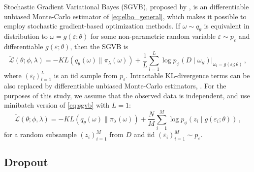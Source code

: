 \documentclass[a4paper,10pt]{article}
\begin{document}
Stochastic Gradient Variational Bayes (SGVB), proposed by \cite{kingma_auto-encoding_2014},
is an differentiable unbiased Monte-Carlo estimator of \eqref{eq:elbo_general}, which makes
it possible to employ stochastic gradient-based optimization methods. If $
  \omega \sim q_{\theta}
$ is equivalent in distribution to $
  \omega = g(\varepsilon; \theta)
$ for some non-parametric random variable $
    \varepsilon \sim p_\varepsilon
$ and differentiable $
  g(\varepsilon; \theta)
$, then the SGVB is
\begin{equation} \label{eq:sgvb}
  \widetilde{\mathcal{L}}(\theta; \phi, \lambda)
    = - KL(q_{\theta}(\omega) \| \pi_{\lambda}(\omega))
      + \frac1{L} \sum_{l=1}^L
        \log p_{\phi}(D \mid \omega_{il})
          \Big\vert_{\omega_{l} = g(\varepsilon_{l}; \theta)}
    \,, 
\end{equation}
where $
  (\varepsilon_{l})_{l=1}^L
$ is an iid sample from $p_\varepsilon$. Intractable KL-divergence terms can be also
replaced by differentiable unbiased Monte-Carlo estimators, \cite{kingma_auto-encoding_2014}.
%
For the purposes of this study, we assume that the observed data is independent, and
use minibatch version of \eqref{eq:sgvb} with $L=1$:
\begin{equation} \label{eq:elbo}
  \widetilde{\mathcal{L}}(\theta; \phi, \lambda)
    = - KL(q_{\theta}(\omega) \| \pi_{\lambda}(\omega))
      + \frac{N}{M} \sum_{i=1}^M
        \log p_{\phi}(z_i \mid g(\varepsilon_i; \theta))
    \,,
\end{equation}
for a random subsample $(z_i)_{i=1}^M$ from $D$ and iid $
  (\varepsilon_i)_{i=1}^M \sim p_\varepsilon
$.

\subsection{Dropout} %
\label{sub:dropout}
\end{document}
